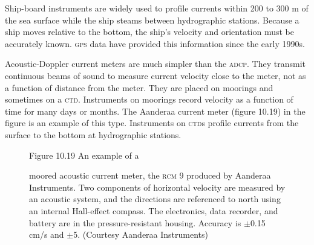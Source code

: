 Ship-board instruments are widely used to profile currents within 200
to 300 m of the sea surface while the ship steams between hydrographic
stations. Because a ship moves relative to the bottom, the ship's
velocity and orientation must be accurately known. \textsc{gps} data
have provided this information since the early 1990s.

Acoustic-Doppler current meters are much simpler than the
\textsc{adcp}. They transmit continuous beams of sound to measure
current velocity close to the meter, not as a function of distance
from the meter. They are placed on moorings and sometimes on a
\textsc{ctd}.  Instruments on moorings record velocity as a function
of time for many days or months. The Aanderaa current meter (figure
10.19) in the figure is an example of this type. Instruments on
\textsc{ctd}s profile currents from the surface to the
bottom at hydrographic stations.

\begin{figure}[t!]
\footnotesize
Figure 10.19 An example of a \rule{0mm}{5ex}moored acoustic current
meter, the \textsc{rcm 9} produced by Aanderaa Instruments. Two
components of horizontal velocity are measured by an acoustic system,
and the directions are referenced to north using an internal
Hall-effect compass. The electronics, data recorder, and battery are
in the pressure-resistant housing. Accuracy is $\pm$0.15 cm/s and $\pm$5\degrees. (Courtesy Aanderaa
Instruments)
\label{fig:RCM9}
\vspace{-2ex}
\end{figure}

